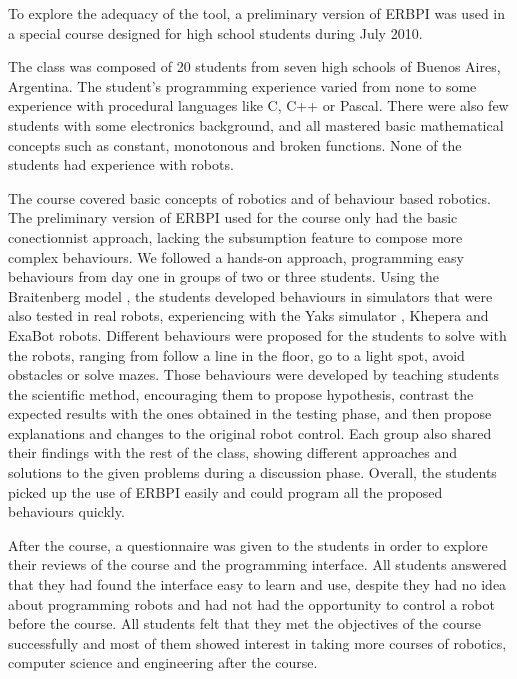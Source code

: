 To explore the adequacy of the tool, a preliminary version of ERBPI was used in a special course designed for high school students during July 2010. 

The class was composed of 20 students from seven %
high schools of Buenos Aires, Argentina. The student's programming experience varied from none to some experience with procedural languages like C, C++ or Pascal. There were also few students with some electronics background, and all mastered basic mathematical concepts such as constant, monotonous and broken functions. None of the students had experience with robots. 

The course covered basic concepts of robotics and of behaviour based robotics. The preliminary version of ERBPI used for the course only had the basic conectionnist approach, lacking the subsumption feature to compose more complex behaviours. We followed a hands-on approach, programming easy behaviours from day one in groups of two or three students. Using the Braitenberg model \cite{braitenberg}, the students developed behaviours in simulators that were also tested in real robots, experiencing with the Yaks simulator \cite{yaks}, Khepera \cite{khepera} and ExaBot \cite{exabot} robots. 
Different behaviours were proposed for the students to solve with the robots, ranging from follow a line in the floor, go to a light spot, avoid obstacles or solve mazes.
Those behaviours were developed by teaching students the scientific method, encouraging them to propose hypothesis, contrast the expected results with the ones obtained in the testing phase, and then propose explanations and changes to the original robot control. Each group also shared their findings with the rest of the class, showing different approaches and solutions to the given problems during a discussion phase. Overall, the students picked up the use of ERBPI easily and could program all the proposed behaviours quickly. %

After the course, a questionnaire was given to the students in order to explore their reviews of the course and the programming interface. All students answered that they had found the interface easy to learn and use, despite they had no idea about programming robots and had not had the opportunity to control a robot before the course. All students felt that they met the objectives of the course successfully and most of them showed interest in taking more courses of robotics, computer science and engineering after the course. 

